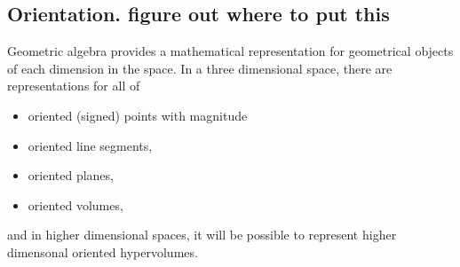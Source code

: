 
\subsection{Orientation.  figure out where to put this}
Geometric algebra provides a mathematical representation for geometrical objects of each dimension in the space.
In a three dimensional space, there are representations for all of

\begin{itemize}
\item
oriented (signed) points with magnitude
\item
oriented line segments,
\item
oriented planes,
\item
oriented volumes,
\end{itemize}

and in higher dimensional spaces, it will be possible to represent higher dimensonal oriented hypervolumes.

